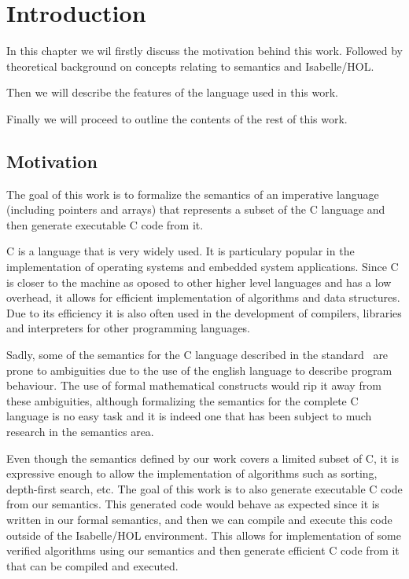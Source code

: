 \chapter{Introduction}\label{chapter:introduction}

In this chapter we wil firstly discuss the motivation behind this work.
Followed by theoretical background on concepts relating to semantics and Isabelle/HOL.

Then we will describe the features of the language used in this work.

Finally we will proceed to outline the contents of the rest of this work.

\section{Motivation}

The goal of this work is to formalize the semantics of an imperative language (including pointers and arrays) that represents a subset of the C language and then generate executable C code from it.

C is a language that is very widely used.
It is particulary popular in the implementation of operating systems and embedded system applications.
Since C is closer to the machine as oposed to other higher level languages and has a low overhead, it allows for efficient implementation of algorithms and data structures.
Due to its efficiency it is also often used in the development of compilers, libraries and interpreters for other programming languages.

Sadly, some of the semantics for the C language described in the standard~\parencite{c99} are prone to ambiguities due to the use of the english language to describe program behaviour.
The use of formal mathematical constructs would rip it away from these ambiguities, although formalizing the semantics for the complete C language is no easy task and it is indeed one that has been subject to much research in the semantics area.

Even though the semantics defined by our work covers a limited subset of C, it is expressive enough to allow the implementation of algorithms such as sorting, depth-first search, etc.
The goal of this work is to also generate executable C code from our semantics.
This generated code would behave as expected since it is written in our formal semantics, and then we can compile and execute this code outside of the Isabelle/HOL environment.
This allows for implementation of some verified algorithms using our semantics and then generate efficient C code from it that can be compiled and executed.


